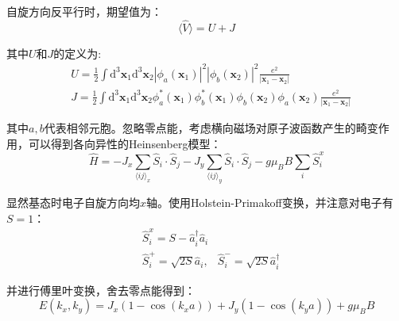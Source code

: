 \documentclass[UTF8]{ctexart}
\begin{document}
\par
自旋方向反平行时，期望值为：
\begin{equation}
    \langle \hat{V} \rangle = U+J
\end{equation}
\par
其中$U$和$J$的定义为:
\begin{align}
    &U = \frac{1}{2}\int \mathrm{d}^3\mathbf{x}_1\mathrm{d}^3\mathbf{x}_2 |\phi_a(\mathbf{x}_1)|^2 |\phi_b(\mathbf{x}_2)|^2\frac{e^2}{|\mathbf{x}_1-\mathbf{x}_2|}\\
    &J = \frac{1}{2}\int \mathrm{d}^3\mathbf{x}_1\mathrm{d}^3\mathbf{x}_2 \phi^*_a(\mathbf{x}_1) \phi^*_b(\mathbf{x}_1) \phi_b(\mathbf{x}_2) \phi_a(\mathbf{x}_2) \frac{e^2}{|\mathbf{x}_1-\mathbf{x}_2|}
\end{align}
\par
其中$a,b$代表相邻元胞。忽略零点能，考虑横向磁场对原子波函数产生的畸变作用，可以得到各向异性的Heinsenberg模型：
\begin{equation}
    \hat{H}=-J_x\sum_{\langle ij \rangle_x}\hat{S}_i \cdot \hat{S}_j-J_y\sum_{\langle ij \rangle_y}\hat{S}_i \cdot \hat{S}_j - g\mu_BB\sum_{i}\hat{S}_i^x
\end{equation}
\par
显然基态时电子自旋方向均$x$轴。使用Holstein-Primakoff变换，并注意对电子有$S=1$：
\begin{align}
    &\hat{S}_i^x=S - \hat{a}^\dagger_i\hat{a}_i\\
    &\hat{S}^+_i=\sqrt{2S}\hat{a}_i,&\hat{S}^-_i=\sqrt{2S}\hat{a}^\dagger_i
\end{align}
\par
并进行傅里叶变换，舍去零点能得到：
\begin{equation}
    E(k_x,k_y)=J_x(1-\cos(k_xa))+J_y(1-\cos(k_ya))+g\mu_BB
\end{equation}
\end{document}
